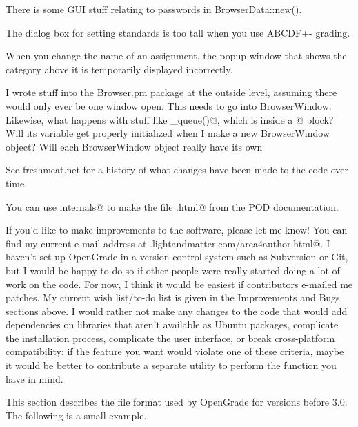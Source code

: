 \documentclass{opengrade_doc}
\begin{document}
There is some GUI stuff relating to passwords in BrowserData::new().

The dialog box for setting standards is too tall when you use
ABCDF+- grading.

When you change the name of an assignment, the popup window that shows
the category above it is temporarily displayed incorrectly.

I wrote stuff into the Browser.pm package at the outside level, assuming
there would only ever be one window open. This needs to go into
BrowserWindow. Likewise, what happens with stuff like \verb@grades_queue()@,
 which
is inside a \verb@BEGIN{}@ block? Will its variable get properly initialized when I
make a new BrowserWindow object? Will each BrowserWindow object really have its
own \verb@%queue@?

\label{programming}
See freshmeat.net for a history of what changes have been made to the
code over time.

You can use \verb@make internals@ to make the file \verb@internals.html@ from the
POD documentation.

If you'd like to make improvements to the software, please let me know!
You can find my current e-mail address at
\verb@www.lightandmatter.com/area4author.html@.
I haven't set up OpenGrade in a version control system such as Subversion or Git, but I would be happy to do so if
other people were really started doing a lot of work on the code.
For now, I think it would be easiest if contributors e-mailed me
patches. My current wish list/to-do list is given in the
Improvements and Bugs sections above. I would rather not make
any changes to the code that would add dependencies on
libraries that aren't available as Ubuntu packages, complicate the installation process, complicate the
user interface, or break cross-platform compatibility; if the feature
you want would violate one of these criteria, maybe it would be
better to contribute a separate utility to perform the function you
have in mind.

\label{old-format}
This section describes the file format used by OpenGrade for versions before 3.0.
The following is a small example.
\end{document}
